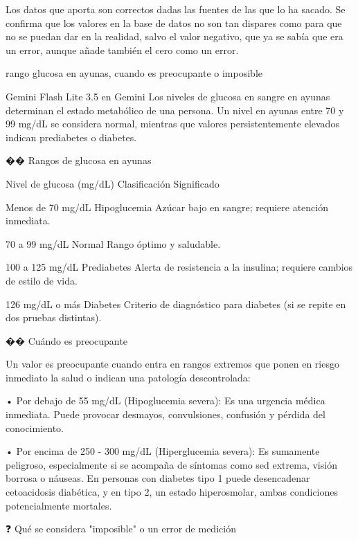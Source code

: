 \documentclass[12pt,a4paper,oneside]{book}
\begin{document}
\begin{iaanalisis}
Los datos que aporta son correctos dadas las fuentes de las que lo ha sacado. Se confirma que los valores en la base de datos no son tan dispares como para que no se puedan dar en la realidad, salvo el valor negativo, que ya se sabía que era un error, aunque añade también el cero como un error.
\end{iaanalisis}





\begin{iaprompt}
rango glucosa en ayunas, cuando es preocupante o imposible
\end{iaprompt}
\begin{iaresp}{Gemini Flash Lite 3.5 en Gemini}
Los niveles de glucosa en sangre en ayunas determinan el estado metabólico de una persona. Un nivel en ayunas entre 70 y 99 mg/dL se considera normal, mientras que valores persistentemente elevados indican prediabetes o diabetes.

�� Rangos de glucosa en ayunas

Nivel de glucosa (mg/dL)	Clasificación	Significado

Menos de 70 mg/dL	Hipoglucemia	Azúcar bajo en sangre; requiere atención inmediata.

70 a 99 mg/dL	Normal	Rango óptimo y saludable.

100 a 125 mg/dL	Prediabetes	Alerta de resistencia a la insulina; requiere cambios de estilo de vida.

126 mg/dL o más	Diabetes	Criterio de diagnóstico para diabetes (si se repite en dos pruebas distintas).

�� Cuándo es preocupante

Un valor es preocupante cuando entra en rangos extremos que ponen en riesgo inmediato la salud o indican una patología descontrolada:

• Por debajo de 55 mg/dL (Hipoglucemia severa): Es una urgencia médica inmediata. Puede provocar desmayos, convulsiones, confusión y pérdida del conocimiento.

• Por encima de 250 - 300 mg/dL (Hiperglucemia severa): Es sumamente peligroso, especialmente si se acompaña de síntomas como sed extrema, visión borrosa o náuseas. En personas con diabetes tipo 1 puede desencadenar cetoacidosis diabética, y en tipo 2, un estado hiperosmolar, ambas condiciones potencialmente mortales.

❓ Qué se considera "imposible" o un error de medición


\end{iaresp}
\end{document}
